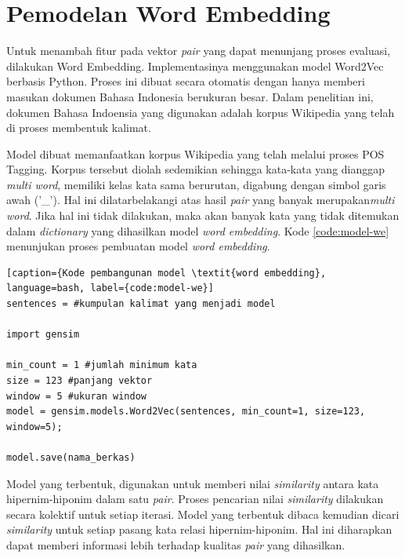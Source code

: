 \section{Pemodelan Word Embedding}
Untuk menambah fitur pada vektor \textit{pair} yang dapat menunjang proses evaluasi, dilakukan Word Embedding. Implementasinya menggunakan model Word2Vec berbasis Python. Proses ini dibuat secara otomatis dengan hanya memberi masukan dokumen Bahasa Indonesia berukuran besar. Dalam penelitian ini, dokumen Bahasa Indoensia yang digunakan adalah korpus Wikipedia yang telah di proses membentuk kalimat.

Model dibuat memanfaatkan korpus Wikipedia yang telah melalui proses POS Tagging. Korpus tersebut diolah sedemikian sehingga kata-kata yang dianggap \textit{multi word}, memiliki kelas kata sama berurutan, digabung dengan simbol garis  awah ('\_'). Hal ini dilatarbelakangi atas hasil \textit{pair} yang banyak merupakan\textit{multi word}. Jika hal ini tidak dilakukan, maka akan banyak kata yang tidak ditemukan dalam \textit{dictionary} yang dihasilkan model \textit{word embedding}. Kode \ref{code:model-we} menunjukan proses pembuatan model \textit{word embedding}.

\begin{lstlisting}[caption={Kode pembangunan model \textit{word embedding}, language=bash, label={code:model-we}]
sentences = #kumpulan kalimat yang menjadi model

import gensim

min_count = 1 #jumlah minimum kata
size = 123 #panjang vektor
window = 5 #ukuran window
model = gensim.models.Word2Vec(sentences, min_count=1, size=123, window=5);

model.save(nama_berkas)
\end{lstlisting}

Model yang terbentuk, digunakan untuk memberi nilai \textit{similarity} antara kata hipernim-hiponim dalam satu \textit{pair}. Proses pencarian nilai \textit{similarity} dilakukan secara kolektif untuk setiap iterasi. Model yang terbentuk dibaca kemudian dicari \textit{similarity} untuk setiap pasang kata relasi hipernim-hiponim. Hal ini diharapkan dapat memberi informasi lebih terhadap kualitas \textit{pair} yang dihasilkan.

